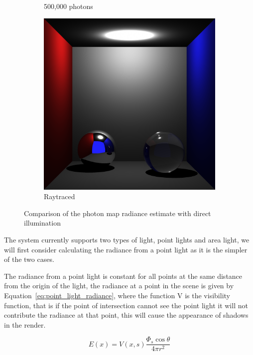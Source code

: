 \begin{figure}[h]
\begin{subfigure}[c]{0.3\textwidth}
	\caption{500,000 photons}
	\end{subfigure}
	\begin{subfigure}[c]{0.3\textwidth}
	\includegraphics[width=\textwidth]{./images/renders/direct_photon_comp/direct.png}
	\caption{Raytraced}
	\end{subfigure}
	\caption{Comparison of the photon map radiance estimate with direct illumination}
\label{fig:direct_compare}
\end{figure}

The system currently supports two types of light, point lights and area light, we will first consider calculating the radiance
from a point light as it is the simpler of the two cases.

The radiance from a point light is constant for all points at the same distance from the origin of the light, the radiance at
a point in the scene is given by Equation~\eqref{eq:point_light_radiance}, where the function V is the visibility function, that
is if the point of intersection cannot see the point light it will not contribute the radiance at that point, this will cause
the appearance of shadows in the render.

\begin{equation}
\label{eq:point_light_radiance}
	E(x) = V(x, s) \frac
	{
		\Phi_s \cos{\theta}
	}
	{
		4 \pi r^2
	}
\end{equation}

